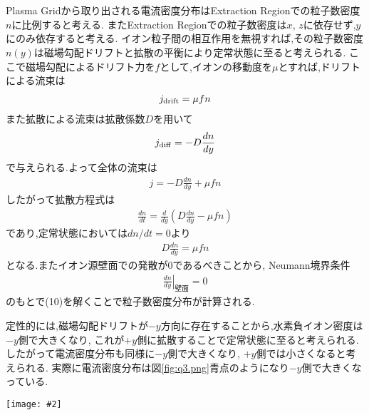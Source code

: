 \documentclass[uplatex,a4j,11pt,dvipdfmx]{jsarticle}
\makeatletter
\def\fgcaption{\def\@captype{figure}\caption}
\newcommand{\mfig}[3][width=15cm]{
\begin{center}
\texttt{[image: \#2]}
\fgcaption{#3 \label{fig:#2}}
\end{center}
}
\makeatother
\begin{document}
\section{}
Plasma Gridから取り出される電流密度分布はExtraction Regionでの粒子数密度$n$に比例すると考える.
またExtraction Regionでの粒子数密度は$x$, $z$に依存せず,$y$にのみ依存すると考える.
イオン粒子間の相互作用を無視すれば,その粒子数密度$n(y)$は磁場勾配ドリフトと拡散の平衡により定常状態に至ると考えられる.
ここで磁場勾配によるドリフト力を$f$として,イオンの移動度を$\mu$とすれば,ドリフトによる流束は
\begin{align}
  j_{\rm drift}=\mu fn
\end{align}
また拡散による流束は拡散係数$D$を用いて
\begin{align}
  j_{\rm diff}=-D\frac{dn}{dy}
\end{align}
で与えられる.よって全体の流束は
\begin{align}
  j=-D\frac{dn}{dy}+\mu fn
\end{align}
したがって拡散方程式は
\begin{align}
  \frac{dn}{dt}=\frac{d}{dy}\left(D\frac{dn}{dy}-\mu fn\right)
\end{align}
であり,定常状態においては$dn/dt=0$より
\begin{align}
  D\frac{dn}{dy}=\mu fn
\end{align}
となる.またイオン源壁面での発散が0であるべきことから, Neumann境界条件
\begin{align}
  \left.\frac{dn}{dy}\right|_{壁面}=0
\end{align}
のもとで(10)を解くことで粒子数密度分布が計算される.

定性的には,磁場勾配ドリフトが$-y$方向に存在することから,水素負イオン密度は$-y$側で大きくなり,
これが$+y$側に拡散することで定常状態に至ると考えられる.
したがって電流密度分布も同様に$-y$側で大きくなり, $+y$側では小さくなると考えられる.
実際に電流密度分布は図\ref{fig:q3.png}青点のようになり$-y$側で大きくなっている.\cite{hatayamaPresentStatusNumerical2018}
\mfig[width=6cm]{q3.png}{$y$方向の電流密度分布の実験値.青点がPG filterの場合.赤線はtent filterの場合.\cite{hatayamaPresentStatusNumerical2018}}

\end{document}
